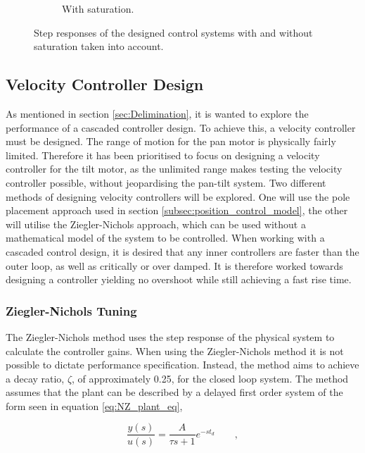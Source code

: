 \documentclass[../../main.tex]{subfiles}
\begin{document}
\begin{figure}[h]
\begin{subfigure}{0.48\textwidth}
    \caption{With saturation.}
    \label{fig:PosStepNoSat}
\end{subfigure}
\caption{Step responses of the designed control systems with and without saturation taken into account.}
\label{fig:PosStep}
\end{figure}


\subsection{Velocity Controller Design}
As mentioned in section \ref{sec:Delimination}, it is wanted to explore the performance of a cascaded controller design. To achieve this, a velocity controller must be designed. The range of motion for the pan motor is physically fairly limited. Therefore it has been prioritised to focus on designing a velocity controller for the tilt motor, as the unlimited range makes testing the velocity controller possible, without jeopardising the pan-tilt system. Two different methods of designing velocity controllers will be explored. One will use the pole placement approach used in section \ref{subsec:position_control_model}, the other will utilise the Ziegler-Nichols approach, which can be used without a mathematical model of the system to be controlled.
When working with a cascaded control design, it is desired that any inner controllers are faster than the outer loop, as well as critically or over damped. It is therefore worked towards designing a controller yielding no overshoot while still achieving a fast rise time.

\subsubsection*{Ziegler-Nichols Tuning}
The Ziegler-Nichols method uses the step response of the physical system to calculate the controller gains. When using the Ziegler-Nichols method it is not possible to dictate performance specification. Instead, the method aims to achieve a decay ratio, $\zeta$, of approximately 0.25, for the closed loop system. The method assumes that the plant can be described by a delayed first order system of the form seen in equation \ref{eq:NZ_plant_eq},

\begin{equation}
    \frac{y(s)}{u(s)} = \frac{A}{\tau s + 1} e^{-s t_d} \qquad ,
    \label{eq:NZ_plant_eq}
\end{equation}
\end{document}

